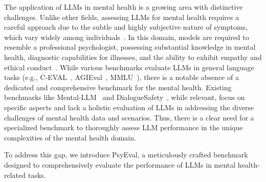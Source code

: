 The application of LLMs in mental health is a growing area with distinctive challenges. Unlike other fields, assessing LLMs for mental health requires a careful approach due to the subtle and highly subjective nature of symptoms, which vary widely among individuals~\cite{taschereau2022putting}.
In this domain, models are required to resemble a professional psychologist, possessing substantial knowledge in mental health, diagnostic capabilities for illnesses, and the ability to exhibit empathy and ethical conduct~\cite{iaap_iupsys_2016}.
While various benchmarks evaluate LLMs in general language tasks (e.g., C-EVAL~\cite{huang2023ceval}, AGIEval~\cite{zhong2023agieval}, MMLU~\cite{hendrycks2021measuring}), there is a notable absence of a dedicated and comprehensive benchmark for the mental health. Existing benchmarks like Mental-LLM~\cite{xu2023leveraging} and DialogueSafety~\cite{qiu2023benchmark}, while relevant, focus on specific aspects and lack a holistic evaluation of LLMs in addressing the diverse challenges of mental health data and scenarios. Thus, there is a clear need for a specialized benchmark to thoroughly assess LLM performance in the unique complexities of the mental health domain. %

To address this gap, we introduce PsyEval, a meticulously crafted benchmark designed to comprehensively evaluate the performance of LLMs in mental health-related tasks. 

